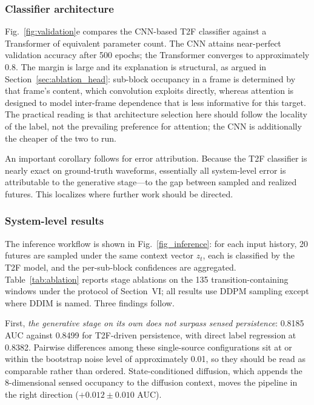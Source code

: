 \documentclass[lettersize,journal]{IEEEtran}
\begin{document}
\subsubsection{\textbf{Classifier architecture}}
Fig.~\ref{fig:validation}e compares the CNN-based T2F classifier against
a Transformer of equivalent parameter count. The CNN attains near-perfect
validation accuracy after 500 epochs; the Transformer converges to
approximately 0.8. The margin is large and its explanation is
structural, as argued in Section~\ref{sec:ablation_head}: sub-block occupancy in
a frame is determined by that frame's content, which convolution exploits
directly, whereas attention is designed to model inter-frame dependence that is
less informative for this target. The practical reading is that
architecture selection here should follow the locality of the label, not
the prevailing preference for attention; the CNN is additionally the cheaper of
the two to run.

An important corollary follows for error attribution. Because the T2F
classifier is nearly exact on ground-truth waveforms, essentially all
system-level error is attributable to the generative stage---to the gap
between sampled and realized futures. This localizes where further work
should be directed.

\subsubsection{\textbf{System-level results}}
\label{sec:system_results}
The inference workflow is shown in Fig.~\ref{fig_inference}: for each input
history, 20 futures are sampled under the same context vector $z_t$, each is
classified by the T2F model, and the per-sub-block confidences are aggregated.
Table~\ref{tab:ablation} reports stage ablations on the 135
transition-containing windows under the protocol of Section~VI; all results use
DDPM sampling except where DDIM is named. Three findings follow.

First, \emph{the generative stage on its own does not surpass sensed
persistence}: 0.8185 AUC against 0.8499 for T2F-driven persistence, with
direct label regression at 0.8382. Pairwise differences among these
single-source configurations sit at or within the bootstrap noise level
of approximately 0.01, so they should be read as comparable rather than
ordered. State-conditioned diffusion, which appends the 8-dimensional
sensed occupancy to the diffusion context, moves the pipeline in the
right direction ($+0.012 \pm 0.010$ AUC).
\end{document}
